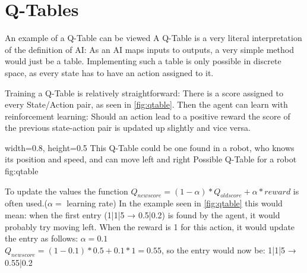 \section{Q-Tables}
\label{sec:QTable}
An example of a Q-Table can be viewed \cite[TicTacToe Example]{c4f}
A Q-Table is a very literal interpretation of the definition of AI: As an AI maps inputs to outputs, a very simple method would just be a table. Implementing such a table is only possible in discrete space, as every state has to have an action assigned to it.

Training a Q-Table is relatively straightforward: There is a score assigned to every State/Action pair, as seen in \autoref{fig:qtable}. Then the agent can learn with reinforcement learning: Should an action lead to a positive reward the score of the previous state-action pair is updated up slightly and vice versa.

    {width=0.8\textwidth, height=0.5\textheight} %
    {This Q-Table could be one found in a robot, who knows its position and speed, and can move left and right}   %
    {Possible Q-Table for a robot}   %
    {fig:qtable}    %

To update the values the function $Q_{new score}=(1-\alpha)*Q_{old score}+\alpha*reward$ is often used.($\alpha=$ learning rate)
In the example seen in \autoref{fig:qtable} this would mean: when the first entry (1|1|5 → 0.5|0.2) is found by the agent, it would probably try moving left. When the reward is 1 for this action, it would update the entry as follows: $\alpha=0.1$\\$Q_{new score}=(1-0.1)*0.5+0.1*1=0.55$, so the entry would now be: 1|1|5 → 0.55|0.2

